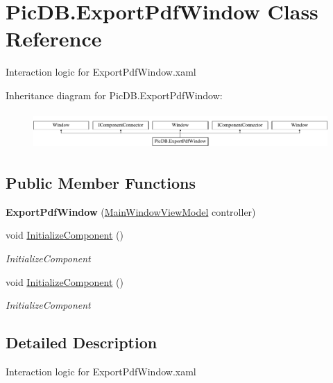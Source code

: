\hypertarget{class_pic_d_b_1_1_export_pdf_window}{}\section{Pic\+D\+B.\+Export\+Pdf\+Window Class Reference}
\label{class_pic_d_b_1_1_export_pdf_window}


Interaction logic for Export\+Pdf\+Window.\+xaml  


Inheritance diagram for Pic\+D\+B.\+Export\+Pdf\+Window\+:\begin{figure}[H]
\begin{center}
\leavevmode
\includegraphics[height=1.417722cm]{class_pic_d_b_1_1_export_pdf_window}
\end{center}
\end{figure}
\subsection*{Public Member Functions}
\begin{DoxyCompactItemize}
\item 
\mbox{\label{class_pic_d_b_1_1_export_pdf_window_a0fe8d98f400f446a54f83e5be855c66c}} 
{\bfseries Export\+Pdf\+Window} (\mbox{\hyperlink{class_pic_d_b_1_1_view_models_1_1_main_window_view_model}{Main\+Window\+View\+Model}} controller)
\item 
void \mbox{\hyperlink{class_pic_d_b_1_1_export_pdf_window_aad2857cbab242278820d73fb64af3fb6}{Initialize\+Component}} ()
\begin{DoxyCompactList}\small\item\em Initialize\+Component \end{DoxyCompactList}\item 
void \mbox{\hyperlink{class_pic_d_b_1_1_export_pdf_window_aad2857cbab242278820d73fb64af3fb6}{Initialize\+Component}} ()
\begin{DoxyCompactList}\small\item\em Initialize\+Component \end{DoxyCompactList}\end{DoxyCompactItemize}


\subsection{Detailed Description}
Interaction logic for Export\+Pdf\+Window.\+xaml 

